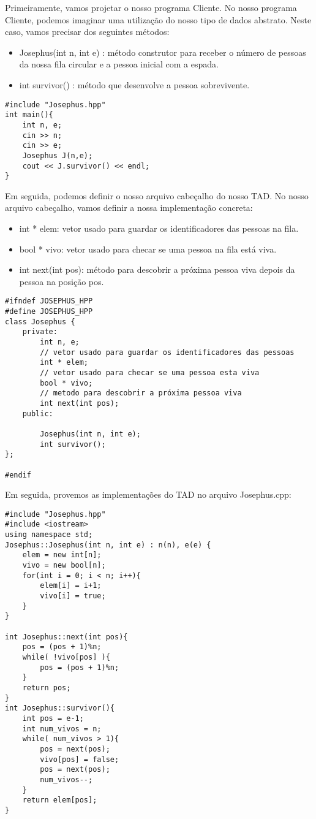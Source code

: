 Primeiramente, vamos projetar o nosso programa Cliente. No nosso programa Cliente, podemos imaginar uma utilização do nosso tipo de dados abstrato. Neste caso, vamos precisar dos seguintes métodos:

\begin{itemize}
    \item Josephus(int n, int e) : método construtor para receber o número de pessoas da nossa fila circular e a pessoa inicial com a espada.
    \item int survivor() : método que desenvolve a pessoa sobrevivente.
\end{itemize}

\begin{verbatim}
#include "Josephus.hpp"
int main(){
    int n, e;
    cin >> n;
    cin >> e;
    Josephus J(n,e);
    cout << J.survivor() << endl;
}
\end{verbatim}

Em seguida, podemos definir o nosso arquivo cabeçalho do nosso TAD. No nosso arquivo cabeçalho, vamos definir a nossa implementação concreta:

\begin{itemize}
    \item int * elem: vetor usado para guardar os identificadores das pessoas na fila.
    \item bool * vivo: vetor usado para checar se uma pessoa na fila está viva.
    \item int next(int pos): método para descobrir a próxima pessoa viva depois da pessoa na posição pos.
\end{itemize}



\begin{verbatim}
#ifndef JOSEPHUS_HPP
#define JOSEPHUS_HPP
class Josephus {
    private:
        int n, e;
        // vetor usado para guardar os identificadores das pessoas    
        int * elem;
        // vetor usado para checar se uma pessoa esta viva
        bool * vivo;
        // metodo para descobrir a próxima pessoa viva
        int next(int pos);
    public:
        
        Josephus(int n, int e);
        int survivor();
};

#endif
\end{verbatim}

Em seguida, provemos as implementações do TAD no arquivo Josephus.cpp:

\begin{verbatim}
#include "Josephus.hpp"
#include <iostream>
using namespace std;
Josephus::Josephus(int n, int e) : n(n), e(e) {
    elem = new int[n];
    vivo = new bool[n];
    for(int i = 0; i < n; i++){
        elem[i] = i+1;
        vivo[i] = true;
    }
}

int Josephus::next(int pos){
    pos = (pos + 1)%n;
    while( !vivo[pos] ){
        pos = (pos + 1)%n;
    }
    return pos;
}
int Josephus::survivor(){
    int pos = e-1;
    int num_vivos = n;
    while( num_vivos > 1){
        pos = next(pos);
        vivo[pos] = false;
        pos = next(pos);            
        num_vivos--;
    }
    return elem[pos];
}
\end{verbatim}


